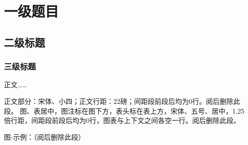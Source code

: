 %
%
%
%
%
%

\chapter{一级题目}

\section{二级标题}

\subsection{三级标题}

正文……

正文部分：宋体、小四；正文行距：22磅；间距段前段后均为0行。阅后删除此段。
图、表居中，图注标在图下方，表头标在表上方，宋体、五号、居中，1.25倍行距，间距段前段后均为0行，图表与上下文之间各空一行。阅后删除此段。

图-示例：（阅后删除此段）
